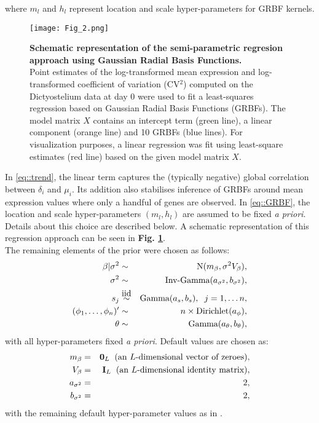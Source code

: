 where $m_l$ and $h_l$ represent location and scale hyper-parameters for GRBF kernels. 

\begin{figure}[!h]
\centering
\texttt{[image: Fig\_2.png]}
\caption[Schematic representation of the regression approach using GRBFs]{\textbf{Schematic representation of the semi-parametric regresion approach using Gaussian Radial Basis Functions.}\\
Point estimates of the log-transformed mean expression and log-transformed coefficient of variation (CV$^2$) computed on the Dictyostelium data at day 0 \citep{Antolovic2017} were used to fit a least-squares regression based on Gaussian Radial Basis Functions (GRBFs). The model matrix $X$ contains an intercept term (green line), a linear component (orange line) and 10 GRBFs (blue lines). For visualization purposes, a linear regression was fit using least-square estimates (red line) based on the given model matrix $X$.}
\label{fig2:GRBFs}
\end{figure}

In \eqref{eq::trend}, the linear term captures the (typically negative) global correlation between $\delta_i$ and $\mu_i$. Its addition also stabilises inference of GRBFs around mean expression values where only a handful of genes are observed. In \eqref{eq::GRBF}, the location and scale hyper-parameters $(m_l, h_l)$ are assumed to be fixed \emph{a priori}.  Details about this choice are described below. A schematic representation of this regression approach can be seen in \textbf{Fig. \ref{fig2:GRBFs}}.\\

The remaining elements of the prior were chosen as follows: \begin{eqnarray}
\beta|\sigma^2 & \sim &\textnormal{N}(m_\beta,\sigma^2V_\beta),\\
\sigma^2 & \sim & \textnormal{Inv-Gamma}(a_{\sigma^2},b_{\sigma^2}),\\
s_j & \stackrel{\mbox{iid}}{\sim} & \textnormal{Gamma}(a_s,b_s), \hspace{0.2cm} j = 1, \ldots n,\\
(\phi_1, \ldots, \phi_n)' & \sim & n \times \textnormal{Dirichlet}(a_\phi),\\
\theta & \sim & \textnormal{Gamma}(a_\theta,b_\theta),
\end{eqnarray} with all hyper-parameters fixed \emph{a priori}. Default values are chosen as: \begin{eqnarray}
m_{\beta} & = & \mathbf{0}_L \hspace{0.2cm} \text{(an $L$-dimensional vector of zeroes)},\\
V_{\beta} & = & \mathbf{I}_L \hspace{0.2cm} \text{(an $L$-dimensional identity matrix)},\\
a_{\sigma^2} & = & 2,\\
b_{\sigma^2} & = & 2,
\end{eqnarray} with the remaining default hyper-parameter values as in \cite{Vallejos2016}.\\


